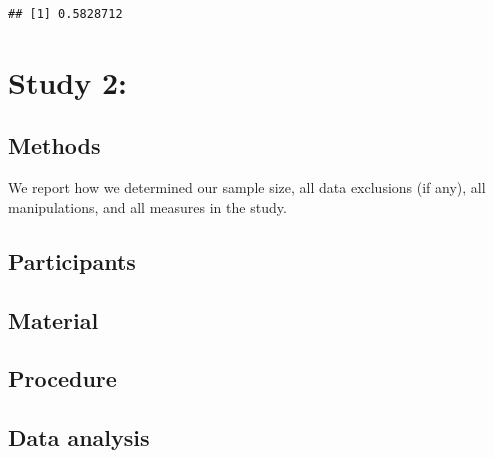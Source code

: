 \documentclass[
  english,
  man,floatsintext]{apa6}
\begin{document}
\begin{verbatim}
## [1] 0.5828712
\end{verbatim}

\section{Study 2:}\label{study-2}

\subsection{Methods}\label{methods-1}

We report how we determined our sample size, all data exclusions (if any), all manipulations, and all measures in the study.

\subsection{Participants}\label{participants-2}

\subsection{Material}\label{material-2}

\subsection{Procedure}\label{procedure-2}

\subsection{Data analysis}\label{data-analysis-2}
\end{document}
